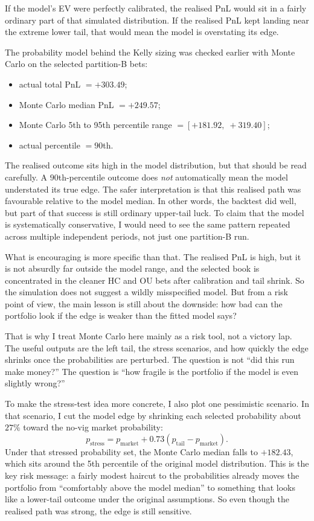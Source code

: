 \documentclass{article}
\begin{document}
If the model's EV were perfectly calibrated, the realised PnL would sit in a fairly ordinary part of that simulated distribution. If the realised PnL kept landing near the extreme lower tail, that would mean the model is overstating its edge.

The probability model behind the Kelly sizing was checked earlier with Monte Carlo on the selected partition-B bets:
\begin{itemize}
    \item actual total PnL \(=+303.49\);
    \item Monte Carlo median PnL \(=+249.57\);
    \item Monte Carlo 5th to 95th percentile range \(=[+181.92,\; +319.40]\);
    \item actual percentile \(=90\)th.
\end{itemize}

The realised outcome sits high in the model distribution, but that should be read carefully. A \(90\)th-percentile outcome does \emph{not} automatically mean the model understated its true edge. The safer interpretation is that this realised path was favourable relative to the model median. In other words, the backtest did well, but part of that success is still ordinary upper-tail luck. To claim that the model is systematically conservative, I would need to see the same pattern repeated across multiple independent periods, not just one partition-B run.

What is encouraging is more specific than that. The realised PnL is high, but it is not absurdly far outside the model range, and the selected book is concentrated in the cleaner HC and OU bets after calibration and tail shrink. So the simulation does not suggest a wildly misspecified model. But from a risk point of view, the main lesson is still about the downside: how bad can the portfolio look if the edge is weaker than the fitted model says?

That is why I treat Monte Carlo here mainly as a risk tool, not a victory lap. The useful outputs are the left tail, the stress scenarios, and how quickly the edge shrinks once the probabilities are perturbed. The question is not ``did this run make money?'' The question is ``how fragile is the portfolio if the model is even slightly wrong?''

To make the stress-test idea more concrete, I also plot one pessimistic scenario. In that scenario, I cut the model edge by shrinking each selected probability about \(27\%\) toward the no-vig market probability:
\[
p_{\text{stress}} = p_{\text{market}} + 0.73\left(p_{\text{tail}} - p_{\text{market}}\right).
\]
Under that stressed probability set, the Monte Carlo median falls to \(+182.43\), which sits around the 5th percentile of the original model distribution. This is the key risk message: a fairly modest haircut to the probabilities already moves the portfolio from ``comfortably above the model median'' to something that looks like a lower-tail outcome under the original assumptions. So even though the realised path was strong, the edge is still sensitive.
\end{document}
